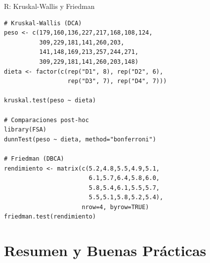 \documentclass[aspectratio=169]{beamer}
\begin{document}
\begin{frame}[fragile]{R: Kruskal-Wallis y Friedman}
\small
\begin{verbatim}
# Kruskal-Wallis (DCA)
peso <- c(179,160,136,227,217,168,108,124,
          309,229,181,141,260,203,
          141,148,169,213,257,244,271,
          309,229,181,141,260,203,148)
dieta <- factor(c(rep("D1", 8), rep("D2", 6),
                  rep("D3", 7), rep("D4", 7)))

kruskal.test(peso ~ dieta)

# Comparaciones post-hoc
library(FSA)
dunnTest(peso ~ dieta, method="bonferroni")

# Friedman (DBCA)
rendimiento <- matrix(c(5.2,4.8,5.5,4.9,5.1,
                        6.1,5.7,6.4,5.8,6.0,
                        5.8,5.4,6.1,5.5,5.7,
                        5.5,5.1,5.8,5.2,5.4),
                      nrow=4, byrow=TRUE)
friedman.test(rendimiento)
\end{verbatim}
\end{frame}

\section{Resumen y Buenas Prácticas}
\end{document}
